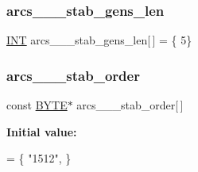 \subsubsection{\texorpdfstring{arcs\+\_\+\_\+\_\+stab\+\_\+gens\+\_\+len}{arcs\_8\_10\_stab\_gens\_len}}
{\footnotesize\ttfamily \mbox{\hyperlink{galois_8h_a09fddde158a3a20bd2dcadb609de11dc}{I\+NT}} arcs\+\_\+\_\+\_\+stab\+\_\+gens\+\_\+len\mbox{[}$\,$\mbox{]} = \{ 5\}}

\mbox{\label{data__hyperovals_8_c_a3625e610fe2b56d333d0e4137606c9c1}} 
\subsubsection{\texorpdfstring{arcs\+\_\+\_\+\_\+stab\+\_\+order}{arcs\_8\_10\_stab\_order}}
{\footnotesize\ttfamily const \mbox{\hyperlink{galois_8h_ab6cc7b4aeb6ea31aba2b3fbfc83ff5e6}{B\+Y\+TE}}$\ast$ arcs\+\_\+\_\+\_\+stab\+\_\+order\mbox{[}$\,$\mbox{]}}

{\bfseries Initial value\+:}
\begin{DoxyCode}
= \{
\textcolor{stringliteral}{"1512"},
\}
\end{DoxyCode}
